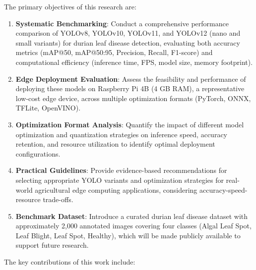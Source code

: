 The primary objectives of this research are:

\begin{enumerate}
\item \textbf{Systematic Benchmarking}: Conduct a comprehensive performance comparison of YOLOv8, YOLOv10, YOLOv11, and YOLOv12 (nano and small variants) for durian leaf disease detection, evaluating both accuracy metrics (mAP@50, mAP@50:95, Precision, Recall, F1-score) and computational efficiency (inference time, FPS, model size, memory footprint).

\item \textbf{Edge Deployment Evaluation}: Assess the feasibility and performance of deploying these models on Raspberry Pi 4B (4 GB RAM), a representative low-cost edge device, across multiple optimization formats (PyTorch, ONNX, TFLite, OpenVINO).

\item \textbf{Optimization Format Analysis}: Quantify the impact of different model optimization and quantization strategies on inference speed, accuracy retention, and resource utilization to identify optimal deployment configurations.

\item \textbf{Practical Guidelines}: Provide evidence-based recommendations for selecting appropriate YOLO variants and optimization strategies for real-world agricultural edge computing applications, considering accuracy-speed-resource trade-offs.

\item \textbf{Benchmark Dataset}: Introduce a curated durian leaf disease dataset with approximately 2,000 annotated images covering four classes (Algal Leaf Spot, Leaf Blight, Leaf Spot, Healthy), which will be made publicly available to support future research.
\end{enumerate}

The key contributions of this work include:

